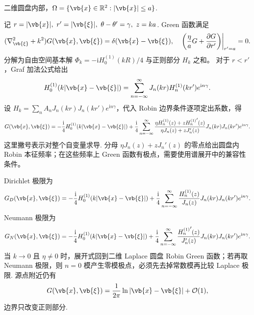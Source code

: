 \begin{example}
	二维圆盘内部，\(\Omega=\{\vb{x}\in\mathbb{R}^2:|\vb{x}|\leq a\}\).
	
	记 \(r=|\vb{x}|,\ r'=|\vb{\xi}|,\ \theta-\theta'=\gamma,\ z=ka\). Green 函数满足
	\begin{equation*}
		(\nabla_{\vb{\xi}}^2+k^2)G(\vb{x},\vb{\xi})=\delta(\vb{x}-\vb{\xi}),
		\quad
		\left.\left(\frac{\eta}{a}G+\frac{\partial G}{\partial r'}\right)\right|_{r'=a}=0.
	\end{equation*}
	分解为自由空间基本解 \(\Phi_k=-\mathrm{i}H_0^{(1)}(kR)/4\) 与正则部分 \(H_k\) 之和。
	对于 \(r<r'\)，Graf 加法公式给出
	\begin{equation*}
		H_0^{(1)}(k|\vb{x}-\vb{\xi}|)=\sum_{n=-\infty}^{\infty}J_n(kr)H_n^{(1)}(kr')e^{\mathrm{i}n\gamma}.
	\end{equation*}
	设 \(H_k=\sum_{n}A_nJ_n(kr)J_n(kr')e^{\mathrm{i}n\gamma}\)，代入 Robin 边界条件逐项定出系数，得
	\begin{equation*}
		G(\vb{x},\vb{\xi})=-\frac{\mathrm{i}}{4}H_0^{(1)}(k|\vb{x}-\vb{\xi}|)
		+\frac{\mathrm{i}}{4}\sum_{n=-\infty}^{\infty}
		\frac{\eta H_n^{(1)}(z)+z{H_n^{(1)}}'(z)}{\eta J_n(z)+zJ_n'(z)}
		J_n(kr)J_n(kr')e^{\mathrm{i}n\gamma}.
	\end{equation*}
	这里撇号表示对整个自变量求导. 分母 \(\eta J_n(z)+zJ_n'(z)\) 的零点给出圆盘内 Robin 本征频率；在这些频率上 Green 函数有极点，需要使用谱展开中的兼容性条件。
	
	Dirichlet 极限为
	\begin{equation*}
		G_D(\vb{x},\vb{\xi})=-\frac{\mathrm{i}}{4}H_0^{(1)}(k|\vb{x}-\vb{\xi}|)
		+\frac{\mathrm{i}}{4}\sum_{n=-\infty}^{\infty}
		\frac{H_n^{(1)}(z)}{J_n(z)}J_n(kr)J_n(kr')e^{\mathrm{i}n\gamma}.
	\end{equation*}
	Neumann 极限为
	\begin{equation*}
		G_N(\vb{x},\vb{\xi})=-\frac{\mathrm{i}}{4}H_0^{(1)}(k|\vb{x}-\vb{\xi}|)
		+\frac{\mathrm{i}}{4}\sum_{n=-\infty}^{\infty}
		\frac{{H_n^{(1)}}'(z)}{J_n'(z)}J_n(kr)J_n(kr')e^{\mathrm{i}n\gamma}.
	\end{equation*}
	当 \(k\to0\) 且 \(\eta\neq0\) 时，展开式回到二维 Laplace 圆盘 Robin Green 函数；若再取 Neumann 极限，则 \(n=0\) 模产生零模极点，必须先去掉常数模再比较 Laplace 极限. 源点附近仍有
	\begin{equation*}
		G(\vb{x},\vb{\xi})=\frac{1}{2\pi}\ln|\vb{x}-\vb{\xi}|+\mathcal{O}(1),
	\end{equation*}
	边界只改变正则部分.
\end{example}

